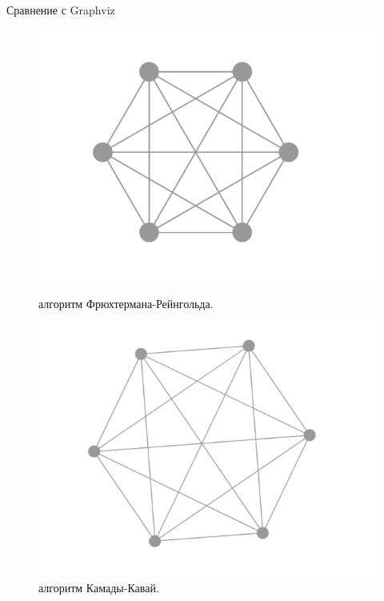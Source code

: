 \documentclass{beamer}
\begin{document}
\begin{frame}{Сравнение с Graphviz}
	\begin{figure}[H]
		\centering
		\begin{minipage}[t]{.32\textwidth}
			\centering
			\includegraphics[width=\linewidth]{./imgs/fg_k6.png}
			\caption*{алгоритм Фрюхтермана-Рейнгольда.}
		\end{minipage}
		\noindent
		\begin{minipage}[t]{.32\textwidth}
			\centering
			\includegraphics[width=\linewidth]{./imgs/kk_k6.png}
			\caption*{алгоритм Камады-Кавай.}
		\end{minipage}
		\begin{minipage}[t]{.32\textwidth}
			\centering

\end{minipage}
\end{figure}
\end{frame}
\end{document}
